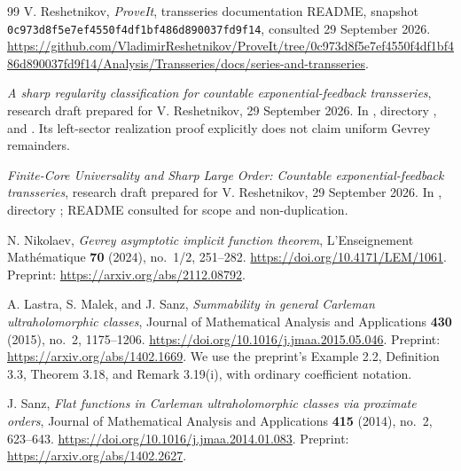\documentclass[11pt,a4paper]{article}
\numberwithin{equation}{section}
\theoremstyle{definition}\newtheorem{definition}[theorem]{Definition}
\theoremstyle{remark}\newtheorem{remark}[theorem]{Remark}
\begin{document}
\clearpage
\begingroup\raggedright
\begin{thebibliography}{99}
V. Reshetnikov, \emph{ProveIt}, transseries documentation README,
snapshot \texttt{0c973d8f5e7ef4550f4df1bf486d890037fd9f14},
consulted 29 September 2026.
\url{https://github.com/VladimirReshetnikov/ProveIt/tree/0c973d8f5e7ef4550f4df1bf486d890037fd9f14/Analysis/Transseries/docs/series-and-transseries}.

\emph{A sharp regularity classification for countable exponential-feedback
transseries}, research draft prepared for V. Reshetnikov, 29 September
2026. In \cite{repo}, directory
,
 and . Its left-sector realization
proof explicitly does not claim uniform Gevrey remainders.

\emph{Finite-Core Universality and Sharp Large Order: Countable
exponential-feedback transseries}, research draft prepared for
V. Reshetnikov, 29 September 2026. In \cite{repo}, directory
; README consulted
for scope and non-duplication.

N. Nikolaev, \emph{Gevrey asymptotic implicit function theorem},
L'Enseignement Math\'ematique \textbf{70} (2024), no.~1/2, 251--282.
\url{https://doi.org/10.4171/LEM/1061}.
Preprint: \url{https://arxiv.org/abs/2112.08792}.

A. Lastra, S. Malek, and J. Sanz,
\emph{Summability in general Carleman ultraholomorphic classes},
Journal of Mathematical Analysis and Applications \textbf{430} (2015),
no.~2, 1175--1206.
\url{https://doi.org/10.1016/j.jmaa.2015.05.046}.
Preprint: \url{https://arxiv.org/abs/1402.1669}.
We use the preprint's Example 2.2, Definition 3.3, Theorem 3.18,
and Remark 3.19(i), with ordinary coefficient notation.

J. Sanz, \emph{Flat functions in Carleman ultraholomorphic classes via
proximate orders}, Journal of Mathematical Analysis and Applications
\textbf{415} (2014), no.~2, 623--643.
\url{https://doi.org/10.1016/j.jmaa.2014.01.083}.
Preprint: \url{https://arxiv.org/abs/1402.2627}.


\end{thebibliography}
\end{document}
